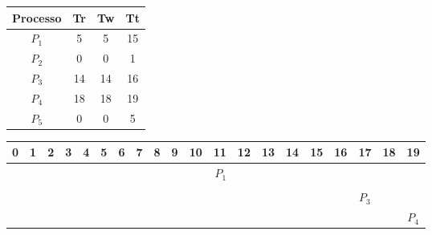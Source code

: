 \documentclass[a4]{article}
\begin{document}
\begin{table}[h!]
    \centering
    \label{my-label}
    \begin{tabular}{|c|c|c|c|}
        \hline
        Processo & Tr & Tw & Tt \\ \hline
        $P_1$    & 5  & 5  & 15 \\ \hline
        $P_2$    & 0  & 0  & 1  \\ \hline
        $P_3$    & 14 & 14 & 16 \\ \hline
        $P_4$    & 18 & 18 & 19 \\ \hline
        $P_5$    & 0  & 0  & 5  \\ \hline
    \end{tabular}
\end{table}

\begin{table}[h]
    \centering
    \label{my-label}
    \begin{tabular}{|c|ccccc|cccccccccc|ccc|c|}
        \hline
        0                                                    & 1                                                  & 2                                                   & 3                                                  & 4                             & 5 & 6 & 7 & 8 & 9 & 10 & 11 & 12 & 13 & 14 & 15 & 16 & 17 & 18 & 19 \\ \hline
                                                             & \multicolumn{5}{c|}{}                              & \multicolumn{10}{c|}{\cellcolor[HTML]{656565}$P_1$} & \multicolumn{3}{c|}{}                              &                                                                                                     \\ \hline
        \cellcolor[HTML]{656565}{\color[HTML]{000000} $P_2$} & \multicolumn{5}{c|}{}                              & \multicolumn{10}{c|}{}                              & \multicolumn{3}{c|}{}                              &                                                                                                     \\ \hline
                                                             & \multicolumn{5}{c|}{}                              & \multicolumn{10}{c|}{}                              & \multicolumn{3}{c|}{\cellcolor[HTML]{656565}$P_3$} &                                                                                                     \\ \hline
                                                             & \multicolumn{5}{c|}{}                              & \multicolumn{10}{c|}{}                              & \multicolumn{3}{c|}{}                              & \cellcolor[HTML]{656565}$P_4$                                                                       \\ \hline

\end{tabular}
\end{table}
\end{document}
